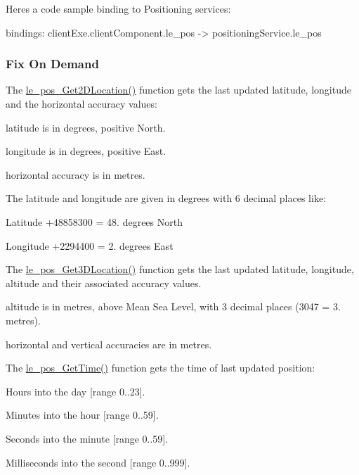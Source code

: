 Here\textquotesingle{}s a code sample binding to Positioning services\+: \begin{DoxyVerb}bindings:
{
   clientExe.clientComponent.le_pos -> positioningService.le_pos
}
\end{DoxyVerb}
\hypertarget{c_pos_le_pos_fix}{}\subsubsection{Fix On Demand}\label{c_pos_le_pos_fix}
The {\ttfamily \hyperlink{le__pos__interface_8h_a0aefc90df207f2e20286ea1be88e70d4}{le\+\_\+pos\+\_\+\+Get2\+D\+Location()}} function gets the last updated latitude, longitude and the horizontal accuracy values\+:


\begin{DoxyItemize}
\item latitude is in degrees, positive North.
\item longitude is in degrees, positive East.
\item horizontal accuracy is in metres.
\end{DoxyItemize}

The latitude and longitude are given in degrees with 6 decimal places like\+:
\begin{DoxyItemize}
\item Latitude +48858300 = 48. degrees North
\item Longitude +2294400 = 2. degrees East
\end{DoxyItemize}

The {\ttfamily \hyperlink{le__pos__interface_8h_ad2e96a853c9e3d4daa351494ff2070ba}{le\+\_\+pos\+\_\+\+Get3\+D\+Location()}} function gets the last updated latitude, longitude, altitude and their associated accuracy values.
\begin{DoxyItemize}
\item altitude is in metres, above Mean Sea Level, with 3 decimal places (3047 = 3. metres).
\item horizontal and vertical accuracies are in metres.
\end{DoxyItemize}

The {\ttfamily \hyperlink{le__pos__interface_8h_a7f8c37ad14a3375eb9b5d6954916be41}{le\+\_\+pos\+\_\+\+Get\+Time()}} function gets the time of last updated position\+:
\begin{DoxyItemize}
\item Hours into the day \mbox{[}range 0..23\mbox{]}.
\item Minutes into the hour \mbox{[}range 0..59\mbox{]}.
\item Seconds into the minute \mbox{[}range 0..59\mbox{]}.
\item Milliseconds into the second \mbox{[}range 0..999\mbox{]}.
\end{DoxyItemize}

